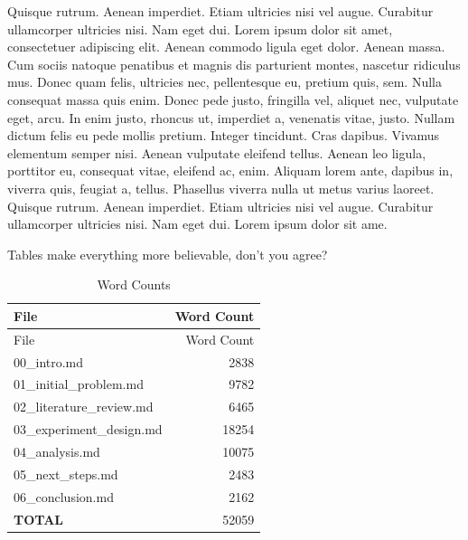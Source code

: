 \documentclass[
    12pt,
    letterpaper,
    oneside,
    noraggedright
]{turabian-researchpaper}
\begin{document}
Quisque rutrum. Aenean imperdiet. Etiam ultricies nisi vel augue.
Curabitur ullamcorper ultricies nisi. Nam eget dui. Lorem ipsum dolor
sit amet, consectetuer adipiscing elit. Aenean commodo ligula eget
dolor. Aenean massa. Cum sociis natoque penatibus et magnis dis
parturient montes, nascetur ridiculus mus. Donec quam felis, ultricies
nec, pellentesque eu, pretium quis, sem. Nulla consequat massa quis
enim. Donec pede justo, fringilla vel, aliquet nec, vulputate eget,
arcu. In enim justo, rhoncus ut, imperdiet a, venenatis vitae, justo.
Nullam dictum felis eu pede mollis pretium. Integer tincidunt. Cras
dapibus. Vivamus elementum semper nisi. Aenean vulputate eleifend
tellus. Aenean leo ligula, porttitor eu, consequat vitae, eleifend ac,
enim. Aliquam lorem ante, dapibus in, viverra quis, feugiat a, tellus.
Phasellus viverra nulla ut metus varius laoreet. Quisque rutrum. Aenean
imperdiet. Etiam ultricies nisi vel augue. Curabitur ullamcorper
ultricies nisi. Nam eget dui. Lorem ipsum dolor sit ame.

Tables make everything more believable, don't you agree?

\begin{longtable}[]{@{}lr@{}}
\caption{Word Counts}\tabularnewline
\toprule()
File & Word Count \\
\midrule()
\endfirsthead
\toprule()
File & Word Count \\
\midrule()
\endhead
00\_intro.md & 2838 \\
01\_initial\_problem.md & 9782 \\
02\_literature\_review.md & 6465 \\
03\_experiment\_design.md & 18254 \\
04\_analysis.md & 10075 \\
05\_next\_steps.md & 2483 \\
06\_conclusion.md & 2162 \\
\textbf{TOTAL} & 52059 \\
\bottomrule()
\end{longtable}
\end{document}
